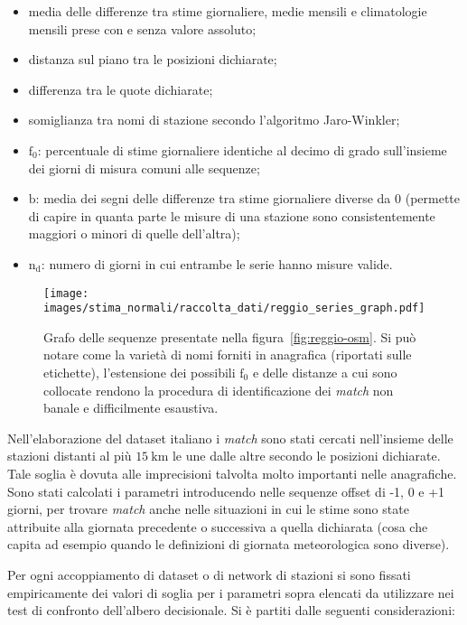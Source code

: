 \begin{itemize}
  \item
    media delle differenze tra stime giornaliere, medie mensili e climatologie mensili prese con e senza valore assoluto;
  \item
    distanza sul piano tra le posizioni dichiarate;
  \item
    differenza tra le quote dichiarate;
  \item
    somiglianza tra nomi di stazione secondo l'algoritmo Jaro-Winkler;
  \item
    \(\mathrm{f}_0\): percentuale di stime giornaliere identiche al decimo di grado sull'insieme dei giorni di misura comuni alle sequenze;
  \item
    \(\mathrm{b}\): media dei segni delle differenze tra stime giornaliere diverse da 0 (permette di capire in quanta parte le misure di una stazione sono consistentemente maggiori o minori di quelle dell'altra);
  \item
    \(\mathrm{n_d}\): numero di giorni in cui entrambe le serie hanno misure valide.
\end{itemize}

\begin{figure}[ht]
  \centering
  \texttt{[image: images/stima\_normali/raccolta\_dati/reggio\_series\_graph.pdf]}
  \caption{Grafo delle sequenze presentate nella figura~\ref{fig:reggio-osm}. Si può notare come la varietà di nomi forniti in anagrafica (riportati sulle etichette), l'estensione dei possibili \(\mathrm{f}_0\) e delle distanze a cui sono collocate rendono la procedura di identificazione dei \emph{match} non banale e difficilmente esaustiva.}\label{fig:reggio-graph}
\end{figure}

Nell'elaborazione del dataset italiano i \emph{match} sono stati cercati nell'insieme delle stazioni distanti al più \(15\:\mathrm{km}\) le une dalle altre secondo le posizioni dichiarate. Tale soglia è dovuta alle imprecisioni talvolta molto importanti nelle anagrafiche. Sono stati calcolati i parametri introducendo nelle sequenze offset di -1, 0 e +1 giorni, per trovare \emph{match} anche nelle situazioni in cui le stime sono state attribuite alla giornata precedente o successiva a quella dichiarata (cosa che capita ad esempio quando le definizioni di giornata meteorologica sono diverse).

Per ogni accoppiamento di dataset o di network di stazioni si sono fissati empiricamente dei valori di soglia per i parametri sopra elencati da utilizzare nei test di confronto dell'albero decisionale. Si è partiti dalle seguenti considerazioni:

